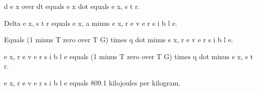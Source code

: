 d e x over dt equals e x dot equals e x, s t r.

Delta e x, s t r equals e x, a minus e x, r e v e r s i b l e.

Equals (1 minus T zero over T G) times q dot minus e x, r e v e r s i b l e.

e x, r e v e r s i b l e equals (1 minus T zero over T G) times q dot minus e x, s t r.

e x, r e v e r s i b l e equals 809.1 kilojoules per kilogram.